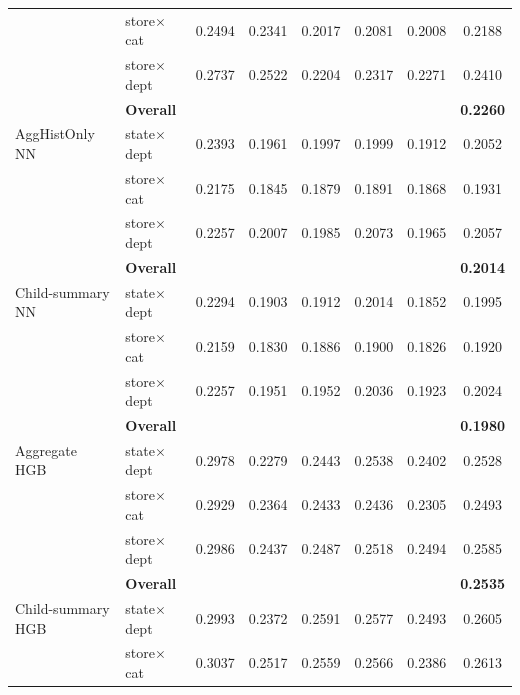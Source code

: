 \begin{table}[H]
\begin{threeparttable}
\begin{tabular}{llccccc|c}
                                   & store$\times$cat       &   0.2494 &   0.2341 &   0.2017 &   0.2081 &   0.2008 &   0.2188 \\
                                   & store$\times$dept      &   0.2737 &   0.2522 &   0.2204 &   0.2317 &   0.2271 &   0.2410 \\
                                   & {\bf Overall} & & & & & & {\bf 0.2260} \\
      \addlinespace
      AggHistOnly NN               & state$\times$dept      &   0.2393 &   0.1961 &   0.1997 &   0.1999 &   0.1912 &   0.2052 \\
                                   & store$\times$cat       &   0.2175 &   0.1845 &   0.1879 &   0.1891 &   0.1868 &   0.1931 \\
                                   & store$\times$dept      &   0.2257 &   0.2007 &   0.1985 &   0.2073 &   0.1965 &   0.2057 \\
                                   & {\bf Overall} & & & & & & {\bf 0.2014} \\
      \addlinespace
      Child-summary NN             & state$\times$dept      &   0.2294 &   0.1903 &   0.1912 &   0.2014 &   0.1852 &   0.1995 \\
                                   & store$\times$cat       &   0.2159 &   0.1830 &   0.1886 &   0.1900 &   0.1826 &   0.1920 \\
                                   & store$\times$dept      &   0.2257 &   0.1951 &   0.1952 &   0.2036 &   0.1923 &   0.2024 \\
                                   & {\bf Overall} & & & & & & {\bf 0.1980} \\
      \addlinespace
      Aggregate HGB                & state$\times$dept      &   0.2978 &   0.2279 &   0.2443 &   0.2538 &   0.2402 &   0.2528 \\
                                   & store$\times$cat       &   0.2929 &   0.2364 &   0.2433 &   0.2436 &   0.2305 &   0.2493 \\
                                   & store$\times$dept      &   0.2986 &   0.2437 &   0.2487 &   0.2518 &   0.2494 &   0.2585 \\
                                   & {\bf Overall} & & & & & & {\bf 0.2535} \\
      \addlinespace
      Child-summary HGB            & state$\times$dept      &   0.2993 &   0.2372 &   0.2591 &   0.2577 &   0.2493 &   0.2605 \\
                                   & store$\times$cat       &   0.3037 &   0.2517 &   0.2559 &   0.2566 &   0.2386 &   0.2613 \\

\end{tabular}
\end{threeparttable}
\end{table}
